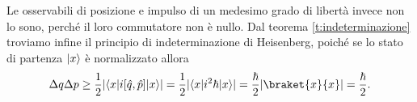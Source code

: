 Le osservabili di posizione e impulso di un medesimo grado di libertà invece non lo sono, perch\'e il loro commutatore non è nullo.
Dal teorema \ref{t:indeterminazione} troviamo infine il principio di indeterminazione di Heisenberg, poich\'e se lo stato di partenza $\lvert x\rangle$ è normalizzato allora
\begin{equation}
	\Delta q\Delta p\geq\frac12\abs{\bra{x}i[\op q,\op p]\ket{x}}=\frac12\abs{\bra{x}i^2\hbar\ket{x}}=\frac{\hbar}2\abs{\braket{x}{x}}=\frac{\hbar}2.
	\label{eq:indeterminazione-heisenberg}
\end{equation}

